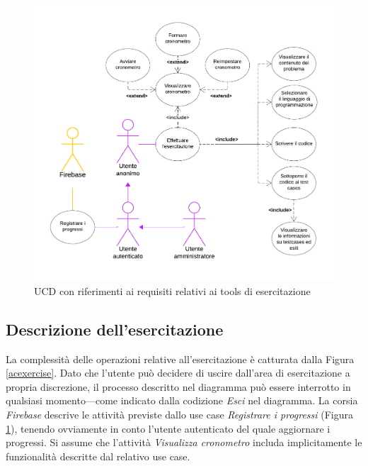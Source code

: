 \documentclass[11pt, a4paper]{article}
\theoremstyle{definition} %
\begin{document}
\begin{figure}[H]
\centering
\hspace*{-1.5cm}
\includegraphics[scale=0.91]{materiale/ucdiagrams/ucesercitazione.pdf}
\caption{UCD con riferimenti ai requisiti relativi ai tools di esercitazione}
\label{esercitaz}
\end{figure}

\newpage
\subsection*{Descrizione dell'esercitazione}
La complessità delle operazioni relative all'esercitazione è
catturata dalla Figura \ref{acexercise}.
Dato che l'utente può decidere di uscire dall'area di esercitazione
a propria discrezione, il processo descritto nel diagramma
può essere interrotto in qualsiasi momento—come indicato dalla codizione
\textit{Esci} nel diagramma. La corsia \textit{Firebase} descrive le
attività previste dallo use case \textit{Registrare i progressi} (Figura \ref{esercitaz}),
tenendo ovviamente in conto l'utente autenticato del quale aggiornare
i progressi.
Si assume che l'attività \textit{Visualizza cronometro} includa
implicitamente le funzionalità descritte dal relativo use case.
\end{document}
